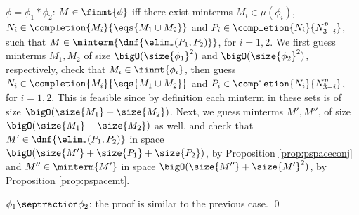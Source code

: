 {\begin{compactitem}

   \item $\phi=\phi_1*\phi_2$: $M \in \finmt{\phi}$ iff there exist
     minterms $M_i \in \mu(\phi_i)$, $N_i \in
     \completion{M_i}{\eqs{M_1\cup M_2}}$ and $P_i \in
     \completion{N_i}{N_{3-i}^p}$, such that $M \in
     \minterm{\dnf{\elim_*(P_1,P_2)}}$, for $i=1,2$. We first guess
     minterms $M_1,M_2$ of size $\bigO(\size{\phi_1}^2)$ and
     $\bigO(\size{\phi_2}^2)$, respectively, check that $M_i \in
     \finmt{\phi_i}$, then guess $N_i \in
     \completion{M_i}{\eqs{M_1\cup M_2}}$ and $P_i \in
     \completion{N_i}{N_{3-i}^p}$, for $i=1,2$. This is feasible since
     by definition each minterm in these sets is of size
     $\bigO(\size{M_1}+\size{M_2})$. Next, we guess minterms $M',
     M''$, of size $\bigO(\size{M_1}+\size{M_2})$ as well, and check
     that $M' \in \dnf{\elim_*(P_1,P_2)}$ in space
     $\bigO(\size{M'}+\size{P_1}+\size{P_2})$, by Proposition
     \ref{prop:pspaceconj} and $M'' \in \minterm{M'}$ in space
     $\bigO(\size{M''}+\size{M'}^2)$, by Proposition
     \ref{prop:pspacemt}.
   \item $\phi_1 \septraction \phi_2$: the proof is similar to the previous case. \qed
\end{compactitem}}


